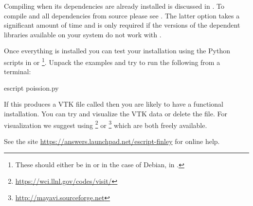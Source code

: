 Compiling \esfinley when its dependencies are already installed is discussed in .
To compile \esfinley and all dependencies from source please see .
The latter option takes a significant amount of time and is only required if the versions of the dependent libraries available on your system do not work with \esfinley.

Once everything is installed you can test your installation using the Python scripts in  or \footnote{These should either be in  or in the case of Debian, in .}.
Unpack the examples and try to run the following from a terminal:
\begin{shellCode}
 escript poission.py
\end{shellCode}
If this produces a VTK file called  then you are likely to have a functional \esfinley installation.
You can try and visualize the VTK data or delete the file.
For visualization we suggest using \footnote{\url{https://wci.llnl.gov/codes/visit/}} or \footnote{\url{http://mayavi.sourceforge.net}} which are both freely available.

See the site \url{https://answers.launchpad.net/escript-finley} for online help.

